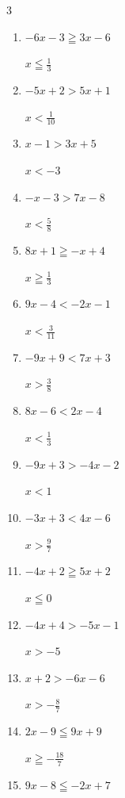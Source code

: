 \begin{multicols}{3}
\begin{enumerate}
  \item $-6x-3\geqq 3x-6$

        $\displaystyle x\leqq \frac{1}{3}$

  \item $-5x+2>5x+1$

        $\displaystyle x<\frac{1}{10}$

  \item $x-1>3x+5$

        $\displaystyle x<-3$

  \item $-x-3>7x-8$

        $\displaystyle x<\frac{5}{8}$

  \item $8x+1\geqq -x+4$

        $\displaystyle x\geqq \frac{1}{3}$

  \item $9x-4<-2x-1$

        $\displaystyle x<\frac{3}{11}$

  \item $-9x+9<7x+3$

        $\displaystyle x>\frac{3}{8}$

\columnbreak %

  \item $8x-6<2x-4$

        $\displaystyle x<\frac{1}{3}$

  \item $-9x+3>-4x-2$

        $\displaystyle x<1$

  \item $-3x+3<4x-6$

        $\displaystyle x>\frac{9}{7}$

  \item $-4x+2\geqq 5x+2$

        $\displaystyle x\leqq 0$

  \item $-4x+4>-5x-1$

        $\displaystyle x>-5$

  \item $x+2>-6x-6$

        $\displaystyle x>-\frac{8}{7}$

  \item $2x-9\leqq 9x+9$

        $\displaystyle x\geqq -\frac{18}{7}$

  \item $9x-8\leqq -2x+7$


\end{enumerate}
\end{multicols}
